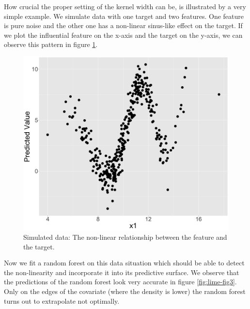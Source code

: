 \documentclass[]{krantz}
\begin{document}
How crucial the proper setting of the kernel width can be, is
illustrated by a very simple example. We simulate data with one target
and two features. One feature is pure noise and the other one has a
non-linear sinus-like effect on the target. If we plot the influential
feature on the x-axis and the target on the y-axis, we can observe this
pattern in figure \ref{fig:lime-fig2}.

\begin{figure}

{\centering \includegraphics[width=0.99\linewidth]{images/04-09-02} 

}

\caption{Simulated data: The non-linear relationship between the feature and the target.}\label{fig:lime-fig2}
\end{figure}

Now we fit a random forest on this data situation which should be able
to detect the non-linearity and incorporate it into its predictive
surface. We observe that the predictions of the random forest look very
accurate in figure \ref{fig:lime-fig3}. Only on the edges of the
covariate (where the density is lower) the random forest turns out to
extrapolate not optimally.
\end{document}
